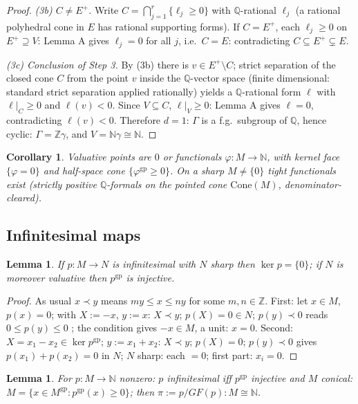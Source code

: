 \documentclass[11pt]{article}
\newtheorem{lemma}[theorem]{Lemma}
\newtheorem{corollary}[theorem]{Corollary}
\theoremstyle{definition}
\newcommand{\gp}{\mathrm{gp}}
\newcommand{\Cone}{\mathrm{Cone}}
\newcommand{\N}{\mathbb{N}}
\newcommand{\Z}{\mathbb{Z}}
\newcommand{\Q}{\mathbb{Q}}
\begin{document}
\begin{proof}
\emph{(3b) $C\ne E^+$.} Write $C=\bigcap_{j=1}^{r}
\{\ell_j\ge0\}$ with $\Q$-rational $\ell_j$ (a rational
polyhedral cone in $E$ has rational supporting forms). If
$C=E^+$, each $\ell_j\ge0$ on $E^+\supseteq V$: Lemma A gives
$\ell_j=0$ for all $j$, i.e.\ $C=E$: contradicting
$C\subseteq E^+\subsetneq E$.

\emph{(3c) Conclusion of Step 3.} By (3b) there is
$v\in E^+\setminus C$; strict separation of the closed cone $C$
from the point $v$ inside the $\Q$-vector space (finite
dimensional: standard strict separation applied rationally)
yields a $\Q$-rational form $\ell$ with $\ell|_C\ge0$ and
$\ell(v)<0$. Since $V\subseteq C$, $\ell|_V\ge0$: Lemma A gives
$\ell=0$, contradicting $\ell(v)<0$. Therefore $d=1$: $\Gamma$
is a f.g.\ subgroup of $\Q$, hence cyclic: $\Gamma=\Z\gamma$,
and $V=\N\gamma\cong\N$.
\end{proof}

\begin{corollary}\label{cor:function}
Valuative points are $0$ or functionals $\varphi:M\to\mathbb N$, with
kernel face $\{\varphi=0\}$ and half-space cone
$\{\varphi^{\gp}\ge0\}$. On a sharp $M\ne\{0\}$ tight functionals
exist \textup{(}strictly positive $\Q$-formals on the pointed cone
$\Cone(M)$, denominator-cleared\textup{)}.
\end{corollary}

\subsection{Infinitesimal maps}

\begin{lemma}\label{lem:inj0}
If $p:M\to N$ is infinitesimal with $N$ sharp then $\ker p=\{0\}$; if
$N$ is moreover valuative then $p^{\gp}$ is injective.
\end{lemma}

\begin{proof}
As usual $x\prec y$ means $my\le x\le ny$ for some $m,n\in\Z$.
First: let $x\in M$, $p(x)=0$; with $X:=-x$, $y:=x$: $X\prec y$;
$p(X)=0\in N$; $p(y)\prec0$ reads $0\le p(y)\le0$ \checkmark; the condition
gives $-x\in M$, a unit: $x=0$.
Second: $X=x_1-x_2\in\ker p^{\gp}$; $y:=x_1+x_2$: $X\prec y$;
$p(X)=0$; $p(y)\prec0$ gives $p(x_1)+p(x_2)=0$ in $N$; $N$ sharp:
each $=0$; first part: $x_i=0$.
\end{proof}

\begin{lemma}\label{lem:infstruct}
For $p:M\to\mathbb N$ nonzero: $p$ infinitesimal iff $p^{\gp}$
injective and $M$ conical: $M=\{x\in M^{\gp}:p^{\gp}(x)\ge0\}$; then
$\pi:=p/{GF}(p):M\cong\mathbb N$.
\end{lemma}
\end{document}
